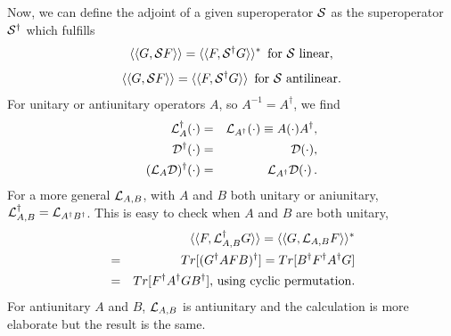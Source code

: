 {Now, we can define the adjoint of a given superoperator ${\cal{S}}$ as the superoperator ${\cal{S}}^\dagger$ which fulfills  \cite{Simon2018}
%
\begin{equation}
\langle\langle G,{\cal{S}}F\rangle\rangle=\langle\langle F,{\cal{S}}^{\dagger}G\rangle\rangle^{*} \, \ {\rm for \ {\cal{S}} \ linear},
\end{equation}
\begin{equation}
\langle\langle G,{\cal{S}}F\rangle\rangle=\langle\langle F,{\cal{S}}^{\dagger}G\rangle\rangle \, \ {\rm for \ {\cal{S}} \ antilinear}.
\end{equation}
%
For   unitary or antiunitary operators $A$, so $A^{-1}=A^{\dagger}$, we find  \cite{Simon2018}
%
\begin{eqnarray}
{\cal L}_A^\dagger(\cdot)&=& {\cal L}_{A^\dagger}(\cdot)\equiv A(\cdot)A^\dagger,
\nonumber\\
{\cal D}^\dagger(\cdot) &=&{\cal D}(\cdot),
\nonumber\\
({\cal L}_{A}{\cal D})^\dagger (\cdot) &=& {\cal L}_{A^\dagger}{\cal D}(\cdot)\,.
\label{adj}
\end{eqnarray}
%
For  a more general ${\cal{L}}_{A,B}$, with $A$ and $B$ both unitary or aniunitary,
${\cal{L}}_{A,B}^{\dagger}={\cal{L}}_{A^{\dagger}B^{\dagger}}$. This is easy to check
when $A$ and $B$ are both unitary,
%
\begin{eqnarray}
&&\langle\langle F,{\cal L}_{A,B}^{\dagger}G \rangle\rangle= \langle\langle G,{\cal L}_{A,B}F \rangle\rangle^{*}
\nonumber\\
&=&Tr[(G^{\dagger}AFB)^\dagger] = Tr[B^{\dagger}F^\dagger A^\dagger G]
\nonumber\\
&=&Tr[F^{\dagger}A^\dagger G B^\dagger],\, {\rm using \ cyclic \ permutation.}
\end{eqnarray}
%
For antiunitary $A$ and $B$, ${\cal{L}}_{A,B}$ is antiunitary and the calculation is more elaborate  but the result is the same.



}
